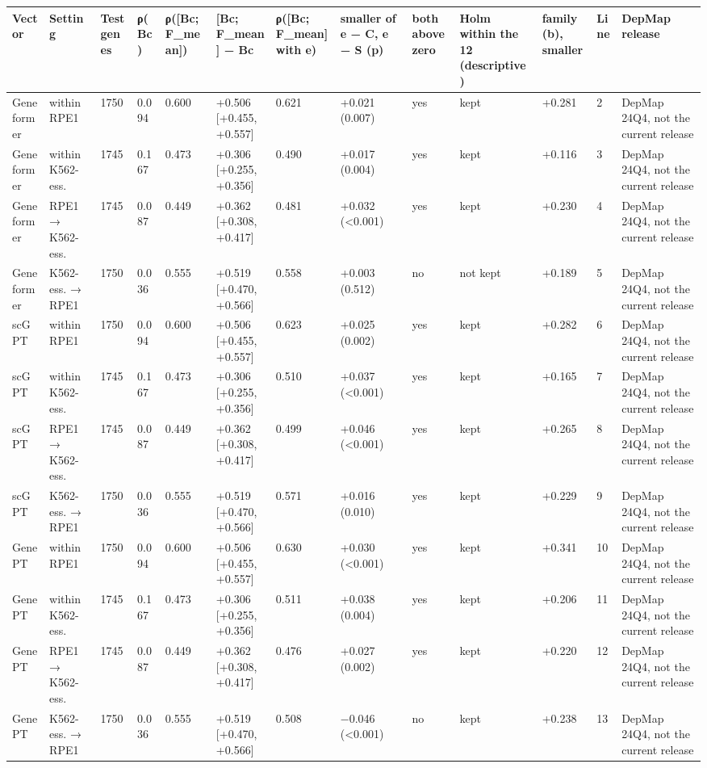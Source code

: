 \begin{tabular}{lllllllllllll}
\toprule
Vector & Setting & Test genes & ρ(Bc) & ρ([Bc; F\_mean]) & [Bc; F\_mean] − Bc & ρ([Bc; F\_mean] with e) & smaller of e − C, e − S (p) & both above zero & Holm within the 12 (descriptive) & family (b), smaller & Line & DepMap release \\
\midrule
Geneformer & within RPE1 & 1750 & 0.094 & 0.600 & +0.506 [+0.455, +0.557] & 0.621 & +0.021 (0.007) & yes & kept & +0.281 & 2 & DepMap 24Q4, not the current release \\
Geneformer & within K562-ess. & 1745 & 0.167 & 0.473 & +0.306 [+0.255, +0.356] & 0.490 & +0.017 (0.004) & yes & kept & +0.116 & 3 & DepMap 24Q4, not the current release \\
Geneformer & RPE1 → K562-ess. & 1745 & 0.087 & 0.449 & +0.362 [+0.308, +0.417] & 0.481 & +0.032 (<0.001) & yes & kept & +0.230 & 4 & DepMap 24Q4, not the current release \\
Geneformer & K562-ess. → RPE1 & 1750 & 0.036 & 0.555 & +0.519 [+0.470, +0.566] & 0.558 & +0.003 (0.512) & no & not kept & +0.189 & 5 & DepMap 24Q4, not the current release \\
scGPT & within RPE1 & 1750 & 0.094 & 0.600 & +0.506 [+0.455, +0.557] & 0.623 & +0.025 (0.002) & yes & kept & +0.282 & 6 & DepMap 24Q4, not the current release \\
scGPT & within K562-ess. & 1745 & 0.167 & 0.473 & +0.306 [+0.255, +0.356] & 0.510 & +0.037 (<0.001) & yes & kept & +0.165 & 7 & DepMap 24Q4, not the current release \\
scGPT & RPE1 → K562-ess. & 1745 & 0.087 & 0.449 & +0.362 [+0.308, +0.417] & 0.499 & +0.046 (<0.001) & yes & kept & +0.265 & 8 & DepMap 24Q4, not the current release \\
scGPT & K562-ess. → RPE1 & 1750 & 0.036 & 0.555 & +0.519 [+0.470, +0.566] & 0.571 & +0.016 (0.010) & yes & kept & +0.229 & 9 & DepMap 24Q4, not the current release \\
GenePT & within RPE1 & 1750 & 0.094 & 0.600 & +0.506 [+0.455, +0.557] & 0.630 & +0.030 (<0.001) & yes & kept & +0.341 & 10 & DepMap 24Q4, not the current release \\
GenePT & within K562-ess. & 1745 & 0.167 & 0.473 & +0.306 [+0.255, +0.356] & 0.511 & +0.038 (0.004) & yes & kept & +0.206 & 11 & DepMap 24Q4, not the current release \\
GenePT & RPE1 → K562-ess. & 1745 & 0.087 & 0.449 & +0.362 [+0.308, +0.417] & 0.476 & +0.027 (0.002) & yes & kept & +0.220 & 12 & DepMap 24Q4, not the current release \\
GenePT & K562-ess. → RPE1 & 1750 & 0.036 & 0.555 & +0.519 [+0.470, +0.566] & 0.508 & −0.046 (<0.001) & no & kept & +0.238 & 13 & DepMap 24Q4, not the current release \\
\bottomrule
\end{tabular}
